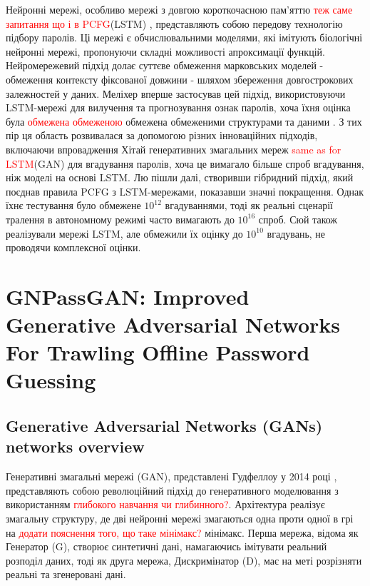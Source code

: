Нейронні мережі, особливо мережі з довгою короткочасною пам'яттю \textcolor{red}{теж саме запитання що і в PCFG}(LSTM) \cite{Long short-term memory}, представляють собою передову технологію підбору паролів. Ці мережі є обчислювальними моделями, які імітують біологічні нейронні мережі, пропонуючи складні можливості апроксимації функцій. Нейромережевий підхід долає суттєве обмеження марковських моделей - обмеження контексту фіксованої довжини - шляхом збереження довгострокових залежностей у даних. Меліхер \cite{Fast lean and accurate: Modeling password guessability using neural networks} вперше застосував цей підхід, використовуючи LSTM-мережі для вилучення та прогнозування ознак паролів, хоча їхня оцінка була \textcolor{red}{обмежена обмеженою} обмежена обмеженими структурами та даними \cite{Regularizing and optimizing lstm language models}. З тих пір ця область розвивалася за допомогою різних інноваційних підходів, включаючи впровадження Хітай \cite{Passgan: A deep learning approach for password guessing} генеративних змагальних мереж \textcolor{red}{same as for LSTM}(GAN) для вгадування паролів, хоча це вимагало більше спроб вгадування, ніж моделі на основі LSTM. Лю \cite{Genpass: A general deep learning model for password guessing with pcfg rules and adversarial generation} пішли далі, створивши гібридний підхід, який поєднав правила PCFG з LSTM-мережами, показавши значні покращення. Однак їхнє тестування було обмежене \(10^{12}\) вгадуваннями, тоді як реальні сценарії тралення в автономному режимі часто вимагають до \(10^{16}\) спроб. Сюй \cite{Password guessing based on lstm recurrent neural networks} також реалізували мережі LSTM, але обмежили їх оцінку до \(10^{10}\) вгадувань, не проводячи комплексної оцінки.

\section{GNPassGAN: Improved Generative Adversarial Networks For Trawling Offline Password Guessing}

\subsection{Generative Adversarial Networks (GANs) networks overview}
Генеративні змагальні мережі (GAN), представлені Гудфеллоу у 2014 році \cite{Goodfellow GANs NIPS}, представляють собою революційний підхід до генеративного моделювання з використанням \textcolor{red}{глибокого навчання чи глибинного?}. Архітектура реалізує змагальну структуру, де дві нейронні мережі змагаються одна проти одної в грі на \textcolor{red}{додати пояснення того, що таке мінімакс?} мінімакс. Перша мережа, відома як Генератор (G), створює синтетичні дані, намагаючись імітувати реальний розподіл даних, тоді як друга мережа, Дискримінатор (D), має на меті розрізняти реальні та згенеровані дані.

